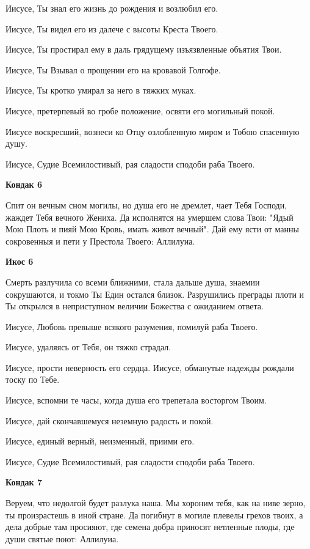Иисусе, Ты знал его жизнь до рождения и возлюбил его. 

Иисусе, Ты видел его из далече с высоты Креста Твоего. 

Иисусе, Ты простирал ему в даль грядущему изъязвленные объятия Твои. 

Иисусе, Ты Взывал о прощении его на кровавой Голгофе. 

Иисусе, Ты кротко умирал за него в тяжких муках. 

Иисусе, претерпевый во гробе положение, освяти его могильный покой. 

Иисусе воскресший, вознеси ко Отцу озлобленную миром и Тобою спасенную душу. 

Иисусе, Судие Всемилостивый, рая сладости сподоби раба Твоего.


\medskip


\bfseries Кондак 6\normalfont{}


Спит он вечным сном могилы, но душа его не дремлет, чает Тебя Господи, жаждет Тебя вечного Жениха. Да исполнятся на умершем слова Твои: "Ядый Мою Плоть и пияй Мою Кровь, имать живот вечный". Дай ему ясти от манны сокровенныя и пети у Престола Твоего: Аллилуиа.


\medskip


\bfseries Икос 6\normalfont{}


Смерть разлучила со всеми ближними, стала дальше душа, знаемии сокрушаются, и токмо Ты Един остался близок. Разрушились преграды плоти и Ты открылся в неприступном величии Божества с ожиданием ответа. 

Иисусе, Любовь превыше всякого разумения, помилуй раба Твоего. 

Иисусе, удаляясь от Тебя, он тяжко страдал. 

Иисусе, прости неверность его сердца. Иисусе, обманутые надежды рождали тоску по Тебе. 

Иисусе, вспомни те часы, когда душа его трепетала восторгом Твоим. 

Иисусе, дай скончавшемуся неземную радость и покой. 

Иисусе, единый верный, неизменный, приими его. 

Иисусе, Судие Всемилостивый, рая сладости сподоби раба Твоего.


\medskip


\bfseries Кондак 7\normalfont{}


Веруем, что недолгой будет разлука наша. Мы хороним тебя, как на ниве зерно, ты произрастешь в иной стране. Да погибнут в могиле плевелы грехов твоих, а дела добрые там просияют, где семена добра приносят нетленные плоды, где души святые поют: Аллилуиа.


